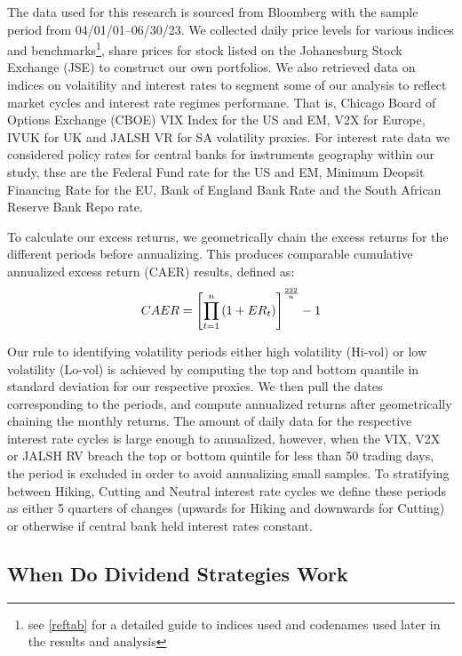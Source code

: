 \documentclass[12pt,preprint, authoryear]{elsarticle}
\numberwithin{equation}{section}
\numberwithin{figure}{section}
\numberwithin{table}{section}
\let\rmarkdownfootnote\footnote%
\def\footnote{\protect\rmarkdownfootnote}
\begin{document}
The data used for this research is sourced from Bloomberg with the
sample period from 04/01/01--06/30/23. We collected daily price levels
for various indices and benchmarks\footnote{see \ref{reftab} for a
  detailed guide to indices used and codenames used later in the results
  and analysis}, share prices for stock listed on the Johanesburg Stock
Exchange (JSE) to construct our own portfolios. We also retrieved data
on indices on volaitility and interest rates to segment some of our
analysis to reflect market cycles and interest rate regimes performane.
That is, Chicago Board of Options Exchange (CBOE) VIX Index for the US
and EM, V2X for Europe, IVUK for UK and JALSH VR for SA volatility
proxies. For interest rate data we considered policy rates for central
banks for instruments geography within our study, thse are the Federal
Fund rate for the US and EM, Minimum Deopsit Financing Rate for the EU,
Bank of England Bank Rate and the South African Reserve Bank Repo rate.

To calculate our excess returns, we geometrically chain the excess
returns for the different periods before annualizing. This produces
comparable cumulative annualized excess return (CAER) results, defined
as: \begin{align}
C A E R=\left[\prod_{t=1}^n\left(1+E R_t\right)\right]^{\frac{222}{n}}-1 \notag
\end{align}

Our rule to identifying volatility periods either high volatility
(Hi-vol) or low volatility (Lo-vol) is achieved by computing the top and
bottom quantile in standard deviation for our respective proxies. We
then pull the dates corresponding to the periods, and compute annualized
returns after geometrically chaining the monthly returns. The amount of
daily data for the respective interest rate cycles is large enough to
annualized, however, when the VIX, V2X or JALSH RV breach the top or
bottom quintile for less than 50 trading days, the period is excluded in
order to avoid annualizing small samples. To stratifying between Hiking,
Cutting and Neutral interest rate cycles we define these periods as
either 5 quarters of changes (upwards for Hiking and downwards for
Cutting) or otherwise if central bank held interest rates constant.

\hypertarget{when-do-dividend-strategies-work}{%
\subsection{When Do Dividend Strategies
Work}\label{when-do-dividend-strategies-work}}
\end{document}
